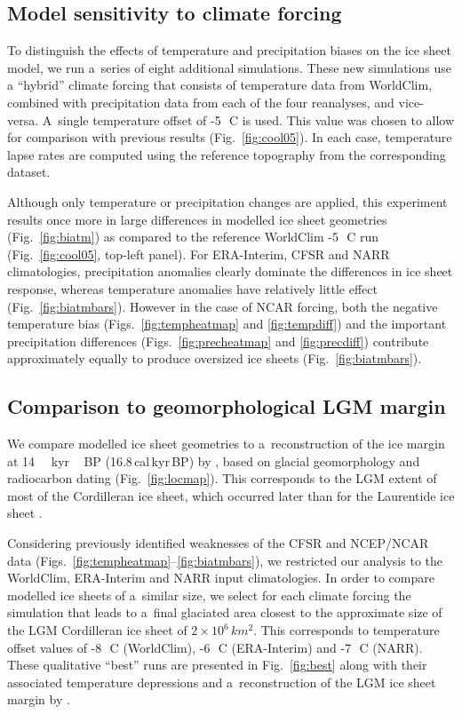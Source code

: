 \documentclass[tc, ms]{copernicus}
\begin{document}
\subsection{Model sensitivity to climate forcing}

To distinguish the effects of temperature and precipitation biases on the ice sheet model, we run a~series of eight additional simulations. These new simulations use a ``hybrid'' climate forcing that consists of temperature data from WorldClim, combined with precipitation data from each of the four reanalyses, and vice-versa. A~single temperature offset of -5\,\unit{{\degree}C} is used. This value was chosen to allow for comparison with previous results (Fig.~\ref{fig:cool05}). In each case, temperature lapse rates are computed using the reference topography from the corresponding dataset.

Although only temperature or precipitation changes are applied, this experiment results once more in large differences in modelled ice sheet geometries (Fig.~\ref{fig:biatm}) as compared to the reference WorldClim -5\,\unit{{\degree}C} run (Fig.~\ref{fig:cool05}, top-left panel). For ERA-Interim, CFSR and NARR climatologies, precipitation anomalies clearly dominate the differences in ice sheet response, whereas temperature anomalies have relatively little effect (Fig.~\ref{fig:biatmbars}). However in the case of NCAR forcing, both the negative temperature bias (Figs.~\ref{fig:tempheatmap} and \ref{fig:tempdiff}) and the important precipitation differences (Figs.~\ref{fig:precheatmap} and \ref{fig:precdiff}) contribute approximately equally to produce oversized ice sheets (Fig.~\ref{fig:biatmbars}).

\subsection{Comparison to geomorphological LGM margin}

We compare modelled ice sheet geometries to a~reconstruction of the ice margin at 14\,\unit{\,kyr\,BP} (16.8\,cal\,kyr\,BP) by \citet{dyke-2004}, based on glacial geomorphology and radiocarbon dating (Fig.~\ref{fig:locmap}). This corresponds to the LGM extent of most of the Cordilleran ice sheet, which occurred later than for the Laurentide ice sheet \citep{porter-swanson-1998,dyke-2004,stroeven-etal-2010,stroeven-etal-inpress}.

Considering previously identified weaknesses of the CFSR and NCEP/NCAR data (Figs.~\ref{fig:tempheatmap}--\ref{fig:biatmbars}), we restricted our analysis to the WorldClim, ERA-Interim and NARR input climatologies. In order to compare modelled ice sheets of a~similar size, we select for each climate forcing the simulation that leads to a~final glaciated area closest to the approximate size of the LGM Cordilleran ice sheet of $2\times 10^6\,\unit{km^2}$. This corresponds to temperature offset values of -8\,\unit{{\degree}C} (WorldClim), -6\,\unit{{\degree}C} (ERA-Interim) and -7\,\unit{{\degree}C} (NARR). These qualitative ``best'' runs are presented in Fig.~\ref{fig:best} along with their associated temperature depressions and a~reconstruction of the LGM ice sheet margin by \citet{dyke-2004}.
\end{document}
